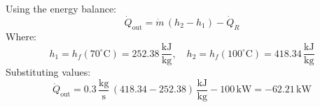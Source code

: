 Using the energy balance:  
\[
\dot{Q}_{\text{out}} = \dot{m} \, (h_2 - h_1) - \dot{Q}_R
\]  
Where:  
\[
h_1 = h_f(70^\circ\text{C}) = 252.38 \, \frac{\text{kJ}}{\text{kg}}, \quad h_2 = h_f(100^\circ\text{C}) = 418.34 \, \frac{\text{kJ}}{\text{kg}}
\]  
Substituting values:  
\[
\dot{Q}_{\text{out}} = 0.3 \, \frac{\text{kg}}{\text{s}} \, (418.34 - 252.38) \, \frac{\text{kJ}}{\text{kg}} - 100 \, \text{kW} = -62.21 \, \text{kW}
\]